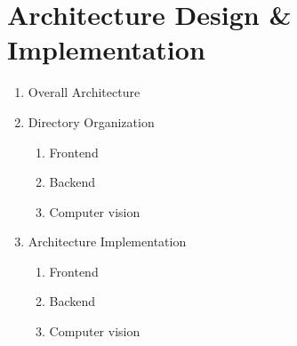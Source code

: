 \newpage
\section{\Large{Architecture Design \& Implementation}}

\begin{enumerate}[label=\arabic*]
    \item {\large{Overall Architecture}}\\

    \item {\large{Directory Organization}}\\
    
    \begin{enumerate}[label=\alph*]
        \item Frontend\\
        \item Backend\\
        \item Computer vision\\
    \end{enumerate}

    \item {\large{Architecture Implementation}}\\
    \begin{enumerate}[label=\alph*]
        \item Frontend\\
        
        \item Backend\\
            
        \item Computer vision\\
    
    \end{enumerate}

\end{enumerate}